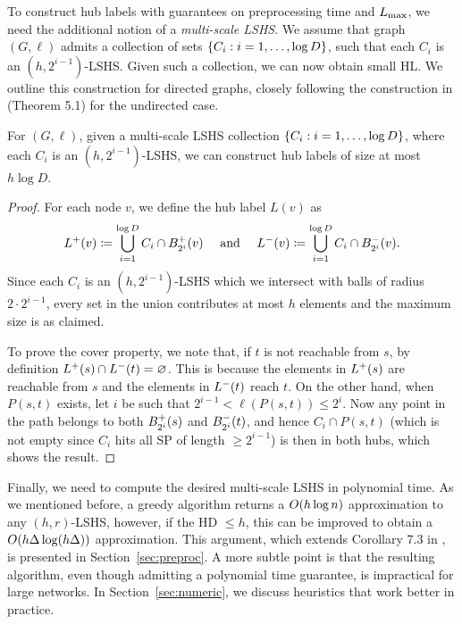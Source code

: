 To construct hub labels with guarantees on preprocessing time and $\Lm$, we need the additional notion of a \emph{multi-scale LSHS}. 
We assume that graph $(G,\ell)$ admits a collection of sets $\crl*{C_i: i=1,\ldots,\log D}$, such that each $C_i$ is an $(h,2^{i-1})$-LSHS.
Given such a collection, we can now obtain small HL.
We outline this construction for directed graphs, closely following the construction in \cite{highway2013} (Theorem 5.1) for the undirected case.
\begin{proposition}
	\label{theo:construct_hl}
	For $(G,\ell)$, given a multi-scale LSHS collection $\crl*{C_i:i=1,\ldots,\log D}$, where each $C_i$ is an $(h,2^{i-1})$-LSHS, we can construct hub labels of size at most $h\log D$.
\end{proposition}
\begin{proof}
	For each node $v$, we define the hub label $L(v)$ as
	\[
	\Lf(v)\defeq  \bigcup_{i=1}^{\log D}C_i\cap \Bf_{2^i}(v) \quad\text{ and }\quad
	\Lb(v)\defeq \bigcup_{i=1}^{\log D}C_i\cap \Bb_{2^i}(v).
	\]
	Since each $C_i$ is an $(h,2^{i-1})$-LSHS which we intersect with balls of radius $2\cdot 2^{i-1}$, every set in the union contributes at most $h$ elements and the maximum size is as claimed.
	
	To prove the cover property, we note that, if $t$ is not reachable from $s$, by definition $\Lf(s)\cap\Lb(t)=\varnothing$.
	This is because the elements in $\Lf(s)$ are reachable from $s$ and the elements in $\Lb(t)$ reach $t$.
	On the other hand, when $P(s,t)$ exists, let $i$ be such that $2^{i-1}<\ell(P(s,t))\leq 2^i$.
	Now any point in the path belongs to both $\Bf_{2^i}(s)$ and $\Bb_{2^i}(t)$, and hence $C_i\cap P(s,t)$  (which is not empty since $C_i$ hits all SP of length $\geq 2^{i-1}$) is then in both hubs, which shows the result.
\end{proof}


Finally, we need to compute the desired multi-scale LSHS in polynomial time.
As we mentioned before, a greedy algorithm returns a $\Or(h\log n)$ approximation to any $(h,r)$-LSHS, however, if the HD $\leq h$, this can be improved to obtain a $\Or(h\Delta\log(h\Delta))$ approximation.
This argument, which extends Corollary 7.3 in \cite{highway2013}, is presented in Section~\ref{sec:preproc}.
A more subtle point is that the resulting algorithm, even though admitting a polynomial time guarantee, is impractical for large networks.
In Section~\ref{sec:numeric}, we discuss heuristics that work better in practice.